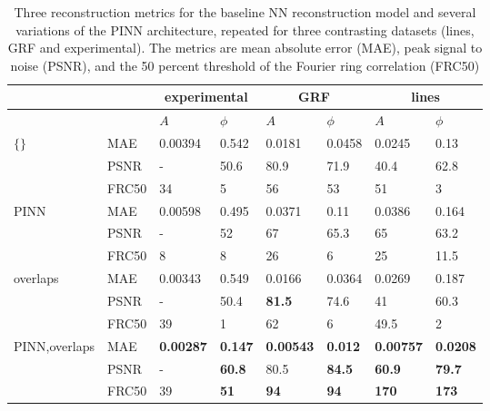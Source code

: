 \documentclass[sn-mathphys]{sn-jnl}%
\theoremstyle{thmstyleone}%
\theoremstyle{thmstyletwo}%
\theoremstyle{thmstylethree}%
\begin{document}
\begin{table}[h]
\begin{center}
\caption{Three reconstruction metrics for the baseline NN reconstruction model and several variations of the PINN architecture, repeated for three contrasting datasets (lines, GRF and experimental). The metrics are mean absolute error (MAE), peak signal to noise (PSNR), and the 50 percent threshold of the Fourier ring correlation (FRC50) }\label{tab2}%
\begin{tabular}{p{2cm}l|ll|ll|ll}
\toprule 
    & \multicolumn{1}{c}{} & \multicolumn{2}{c}{experimental} & \multicolumn{2}{c}{GRF} & \multicolumn{2}{c}{lines}\\
    \midrule
    &
    & $A$ & $\phi$
    & $A$ & $\phi$
    & $A$ & $\phi$ \\
    \midrule
$\{\}$\footnotemark[1]    
& MAE & 0.00394 & 0.542 & 0.0181 & 0.0458 & 0.0245 & 0.13 \\
& PSNR & -  & 50.6 & 80.9 & 71.9 & 40.4 & 62.8 \\
& FRC50 & 34 & 5 & 56 & 53 & 51 & 3 \\
    \midrule
$\mathrm{PINN} $
& MAE & 0.00598 & 0.495 & 0.0371 & 0.11 & 0.0386 & 0.164 \\
& PSNR & -  & 52 & 67 & 65.3 & 65 & 63.2 \\
& FRC50 & 8 & 8 & 26 & 6 & 25 & 11.5 \\
    \midrule
overlaps
& MAE & 0.00343 & 0.549 & 0.0166 & 0.0364 & 0.0269 & 0.187 \\
& PSNR & -  & 50.4 & \textbf{81.5} & 74.6 & 41 & 60.3 \\
& FRC50 & 39 & 1 & 62 & 6 & 49.5 & 2 \\
    \midrule
PINN,overlaps\footnotemark[2]    
& MAE & \textbf{0.00287} & \textbf{0.147} & \textbf{0.00543} & \textbf{0.012} & \textbf{0.00757} & \textbf{0.0208} \\
& PSNR & -  & \textbf{60.8} & 80.5 & \textbf{84.5} & \textbf{60.9} & \textbf{79.7} \\
& FRC50 & 39 & \textbf{51} & \textbf{94} & \textbf{94} & \textbf{170} & \textbf{173} \\
\end{tabular}
\end{center}
\end{table}
\end{document}
